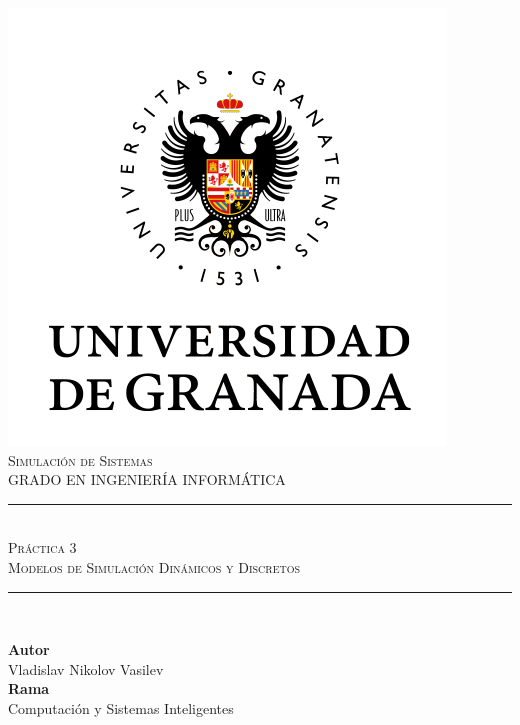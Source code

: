 \documentclass[11pt,a4paper]{article}
\newcommand{\asignatura}{Simulación de Sistemas}
\newcommand{\autor}{Vladislav Nikolov Vasilev}
\newcommand{\titulo}{Práctica 3}
\newcommand{\subtitulo}{Modelos de Simulación Dinámicos y Discretos}
\begin{document}

\begin{titlepage}

\begin{minipage}{\textwidth}

\centering

\includegraphics[scale=0.5]{img/ugr.png}\\

\textsc{\Large \asignatura{}\\[0.2cm]}
\textsc{GRADO EN INGENIERÍA INFORMÁTICA}\\[1cm]

\noindent\rule[-1ex]{\textwidth}{1pt}\\[1.5ex]
\textsc{{\Huge \titulo\\[0.5ex]}}
\textsc{{\Large \subtitulo\\}}
\noindent\rule[-1ex]{\textwidth}{2pt}\\[3.5ex]

\end{minipage}

\vspace{0.5cm}

\begin{minipage}{\textwidth}

\centering

\textbf{Autor}\\ {\autor{}}\\[2.5ex]
\textbf{Rama}\\ {Computación y Sistemas Inteligentes}\\[2.5ex]
\vspace{0.3cm}


\end{minipage}
\end{titlepage}
\end{document}

